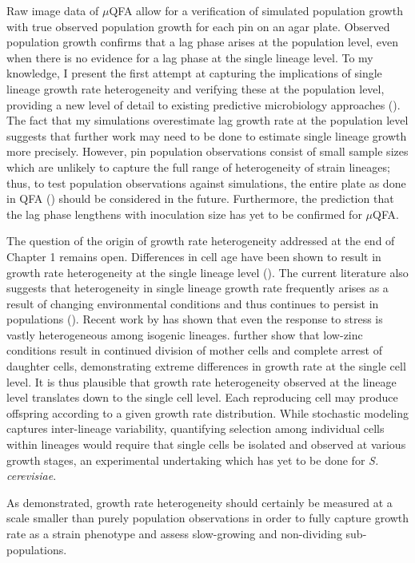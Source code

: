 \documentclass{bioinfo}
\begin{document}
{Raw image data of $\mu$QFA allow for a verification of simulated population growth with true observed population growth for each pin on an agar plate. Observed population growth confirms that a lag phase arises at the population level, even when there is no evidence for a lag phase at the single lineage level. To my knowledge, I present the first attempt at capturing the implications of single lineage growth rate heterogeneity and verifying these at the population level, providing a new level of detail to existing predictive microbiology approaches (\citealp{Baranyi94}). The fact that my simulations overestimate lag growth rate at the population level suggests that further work may need to be done to estimate single lineage growth more precisely. However, pin population observations consist of small sample sizes which are unlikely to capture the full range of heterogeneity of strain lineages; thus, to test population observations against simulations, the entire plate as done in QFA (\citealp{Addinall11}) should be considered in the future. Furthermore, the prediction that the lag phase lengthens with inoculation size has yet to be confirmed for $\mu$QFA.

The question of the origin of growth rate heterogeneity addressed at the end of Chapter 1 remains open. Differences in cell age have been shown to result in growth rate heterogeneity at the single lineage level (\citealp{Ginovart11}). The current literature also suggests that heterogeneity in single lineage growth rate frequently arises as a result of changing environmental conditions and thus continues to persist in populations (\citealp{Levy12,Cooper01,Batchelor97}). Recent work by \cite{Dijk15} has shown that even the response to stress is vastly heterogeneous among isogenic lineages. \cite{Avraham13} further show that low-zinc conditions result in continued division of mother cells and complete arrest of daughter cells, demonstrating extreme differences in growth rate at the single cell level. It is thus plausible that growth rate heterogeneity observed at the lineage level translates down to the single cell level. Each reproducing cell may produce offspring according to a given growth rate distribution. While stochastic modeling captures inter-lineage variability, quantifying selection among individual cells within lineages would require that single cells be isolated and observed at various growth stages, an experimental undertaking which has yet to be done for \textit{S. cerevisiae}. 

As demonstrated, growth rate heterogeneity should certainly be measured at a scale smaller than purely population observations in order to fully capture growth rate as a strain phenotype and assess slow-growing and non-dividing sub-populations. 

}
\end{document}
